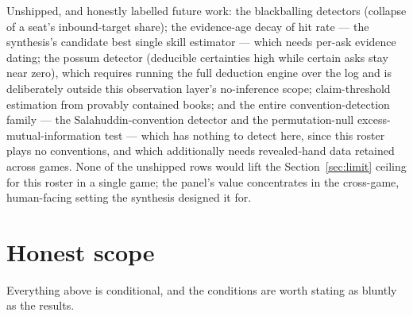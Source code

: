 \documentclass[11pt]{article}
\begin{document}
Unshipped, and honestly labelled future work: the blackballing detectors (collapse of a
seat's inbound-target share); the evidence-age decay of hit rate --- the synthesis's
candidate best single skill estimator --- which needs per-ask evidence dating; the possum
detector (deducible certainties high while certain asks stay near zero), which requires
running the full deduction engine over the log and is deliberately outside this observation
layer's no-inference scope; claim-threshold estimation from provably contained books; and
the entire convention-detection family --- the Salahuddin-convention detector and the
permutation-null excess-mutual-information test --- which has nothing to detect here, since
this roster plays no conventions, and which additionally needs revealed-hand data retained
across games. None of the unshipped rows would lift the Section~\ref{sec:limit} ceiling for
this roster in a single game; the panel's value concentrates in the cross-game, human-facing
setting the synthesis designed it for.

\section{Honest scope}
\label{sec:scope}

Everything above is conditional, and the conditions are worth stating as bluntly as the
results.
\end{document}

